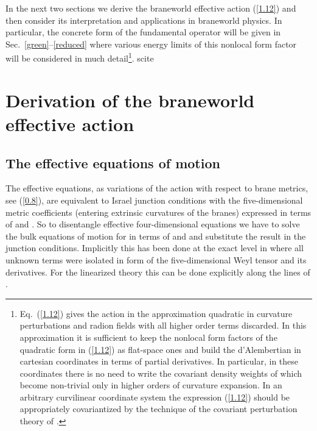 \documentclass[a4paper,preprint,nofootinbib,
                 showpacs,preprintnumbers,amsmath,amssymb]{revtex4}
\begin{document}
In the next two sections we derive the braneworld 
effective action (\ref{1.12}) and then 
consider its interpretation and applications in 
braneworld physics. In particular, the concrete form 
of the fundamental operator \coordHE{} will be given 
in Sec.~\ref{green}--\ref{reduced} where various energy 
limits of this nonlocal form factor will be considered 
in much detail\footnote{Eq.~(\ref{1.12}) gives the action in the 
approximation quadratic in curvature perturbations and radion 
fields \coordHE{} with all higher 
order terms discarded. In this approximation it 
is sufficient to keep the nonlocal form factors of the quadratic 
form in (\ref{1.12}) as flat-space ones and build the 
d'Alembertian in cartesian coordinates in terms of partial 
derivatives. In particular, in these coordinates there is no need 
to write the covariant density weights of \coordHE{} 
which become non-trivial only in higher orders of curvature 
expansion. In an arbitrary curvilinear coordinate system the 
expression (\ref{1.12}) should be appropriately covariantized  
by the technique of the covariant perturbation  
theory of \cite{CPT,CPTIII}.}. 
 scite
\section{Derivation of the braneworld effective action 
\label{der}} 
 
\subsection{The effective equations of motion\label{eom}} 
 
The effective equations, as variations of the 
action with respect to brane metrics, see (\ref{0.8}), are 
equivalent to Israel junction conditions with the five-dimensional 
metric coefficients \coordHE{} (entering extrinsic curvatures 
of the branes) expressed in terms of \coordHE{} and 
\coordHE{}. So to disentangle effective four-dimensional 
equations we have to solve the bulk equations of motion for 
\coordHE{} in terms of \coordHE{} and 
\coordHE{} and substitute the result in the junction 
conditions. Implicitly this has been done at the exact level in 
\cite{ShiMaSa} where all unknown terms were isolated in form of 
the five-dimensional Weyl tensor and its derivatives. For the 
linearized theory this can be done explicitly along the lines of 
\cite{GT}. 
 
\end{document}

